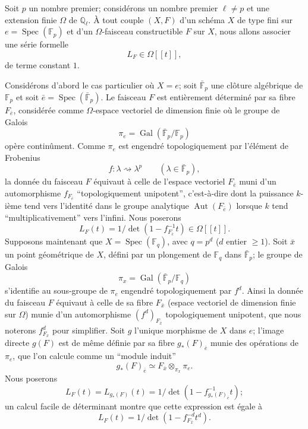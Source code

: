 \documentclass[11pt]{article}
\DeclareMathOperator{\Spec}{Spec}
\providecommand{\Gal}{\operatorname{Gal}}
\providecommand{\Aut}{\operatorname{Aut}}
\providecommand{\Spec}{\operatorname{Spec}}
\providecommand{\Spec}{\operatorname{Spec}}
\providecommand{\Aut}{\operatorname{Aut}}
\providecommand{\Spec}{\operatorname{Spec}}
\providecommand{\Spec}{\operatorname{Spec}}
\providecommand{\Gal}{\operatorname{Gal}}
\begin{document}
Soit $p$ un nombre premier; considérons un nombre premier $\ell\ne p$ et une extension finie $\Omega$ de $\mathbb Q_\ell$. À tout couple $(X,F)$ d'un schéma $X$ de type fini sur $e=\Spec(\mathbb F_p)$ et d'un $\Omega$-faisceau constructible $F$ sur $X$, nous allons associer une série formelle
\[
L_F\in\Omega[[t]],
\]
de terme constant $1$.


Considérons d'abord le cas particulier où $X=e$; soit $\bar{\mathbb F}_p$ une clôture algébrique de $\mathbb F_p$ et soit $\bar e=\Spec(\bar{\mathbb F}_p)$. Le faisceau $F$ est entièrement déterminé par sa fibre $F_{\bar e}$, considérée comme $\Omega$-espace vectoriel de dimension finie où le groupe de Galois
\[
\pi_e=\Gal(\bar{\mathbb F}_p/\mathbb F_p)
\]
opère continûment. Comme $\pi_e$ est engendré topologiquement par l'élément de Frobenius
\[
f: \lambda\rightsquigarrow \lambda^p\qquad(\lambda\in\bar{\mathbb F}_p),
\]
la donnée du faisceau $F$ équivaut à celle de l'espace vectoriel $F_{\bar e}$ muni d'un automorphisme $f_{F_{\bar e}}$ ``topologiquement unipotent'', c'est-à-dire dont la puissance $k$-ième tend vers l'identité dans le groupe analytique $\Aut(F_{\bar e})$ lorsque $k$ tend ``multiplicativement'' vers l'infini. Nous poserons
\[
L_F(t)=1/\det(1-f_{F_{\bar e}}^{-1}t)\in\Omega[[t]].
\]
Supposons maintenant que $X=\Spec(\mathbb F_q)$, avec $q=p^d$ ($d$ entier $\ge1$). Soit $\bar x$ un point géométrique de $X$, défini par un plongement de $\mathbb F_q$ dans $\bar{\mathbb F}_p$; le groupe de Galois
\[
\pi_x=\Gal(\bar{\mathbb F}_p/\mathbb F_q)
\]
s'identifie au sous-groupe de $\pi_e$ engendré topologiquement par $f^d$. Ainsi la donnée du faisceau $F$ équivaut à celle de sa fibre $F_{\bar x}$ (espace vectoriel de dimension finie sur $\Omega$) munie d'un automorphisme $(f^d)_{F_{\bar x}}$ topologiquement unipotent, que nous noterons $f^d_{F_{\bar x}}$ pour simplifier. Soit $g$ l'unique morphisme de $X$ dans $e$; l'image directe $g(F)$ est de même définie par sa fibre $g_*(F)_{\bar e}$ munie des opérations de $\pi_e$, que l'on calcule comme un ``module induit''
\[
g_*(F)_{\bar e}\simeq F_{\bar x}\otimes_{\pi_x}\pi_e.
\]
Nous poserons
\[
L_F(t)=L_{g_*(F)}(t)=1/\det(1-f^{-1}_{g_*(F)_{\bar e}}t);
\]
un calcul facile de déterminant montre que cette expression est égale 
à
\[
L_F(t)=1/\det(1-f^{-d}_{F_{\bar x}}t^d).
\]
\end{document}
